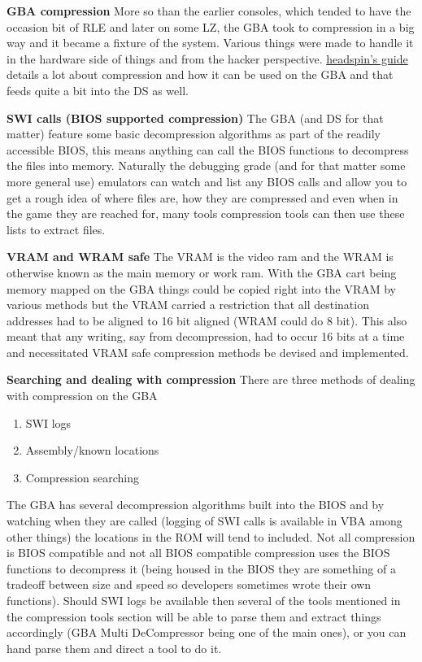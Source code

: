 \documentclass[
]{book}
\providecommand{\tightlist}{%
  \setlength{\itemsep}{0pt}\setlength{\parskip}{0pt}}
\begin{document}
\textbf{GBA compression} More so than the earlier consoles, which tended to have the occasion bit of RLE and later on some LZ, the GBA took to compression in a big way and it became a fixture of the system. Various things were made to handle it in the hardware side of things and from the hacker perspective. \href{http://members.iinet.net.au/~freeaxs/gbacomp/}{headspin's guide} details a lot about compression and how it can be used on the GBA and that feeds quite a bit into the DS as well.

\textbf{SWI calls (BIOS supported compression)} The GBA (and DS for that matter) feature some basic decompression algorithms as part of the readily accessible BIOS, this means anything can call the BIOS functions to decompress the files into memory. Naturally the debugging grade (and for that matter some more general use) emulators can watch and list any BIOS calls and allow you to get a rough idea of where files are, how they are compressed and even when in the game they are reached for, many tools compression tools can then use these lists to extract files.

\textbf{VRAM and WRAM safe} The VRAM is the video ram and the WRAM is otherwise known as the main memory or work ram. With the GBA cart being memory mapped on the GBA things could be copied right into the VRAM by various methods but the VRAM carried a restriction that all destination addresses had to be aligned to 16 bit aligned (WRAM could do 8 bit). This also meant that any writing, say from decompression, had to occur 16 bits at a time and necessitated VRAM safe compression methods be devised and implemented.

\textbf{Searching and dealing with compression} There are three methods of dealing with compression on the GBA

\begin{enumerate}
\def\labelenumi{\arabic{enumi}.}
\tightlist
\item
  SWI logs
\item
  Assembly/known locations
\item
  Compression searching
\end{enumerate}

The GBA has several decompression algorithms built into the BIOS and by watching when they are called (logging of SWI calls is available in VBA among other things) the locations in the ROM will tend to included. Not all compression is BIOS compatible and not all BIOS compatible compression uses the BIOS functions to decompress it (being housed in the BIOS they are something of a tradeoff between size and speed so developers sometimes wrote their own functions). Should SWI logs be available then several of the tools mentioned in the compression tools section will be able to parse them and extract things accordingly (GBA Multi DeCompressor being one of the main ones), or you can hand parse them and direct a tool to do it.
\end{document}
